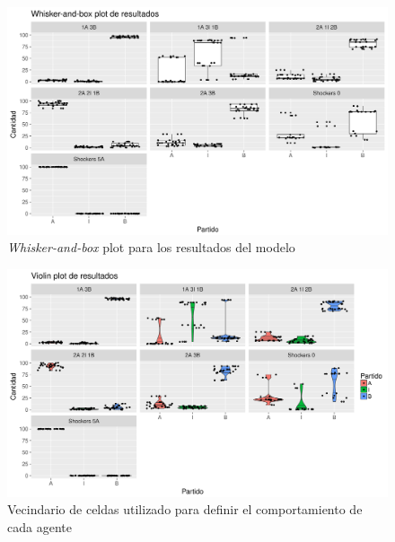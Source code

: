 \begin{figure}[!h]
\centering
\includegraphics[scale=0.5]{imagenes/histograma_resultados.png}
    \caption{\textit{Whisker-and-box} plot para los resultados del modelo}
\label{fig:modelo_shock_box}
\end{figure}

\begin{figure}[!h]
\centering
\includegraphics[scale=0.5]{imagenes/violin_resultados.png}
\caption{Vecindario de celdas utilizado para definir el comportamiento de cada agente}
\label{fig:modelo_shock_violin}
\end{figure}


